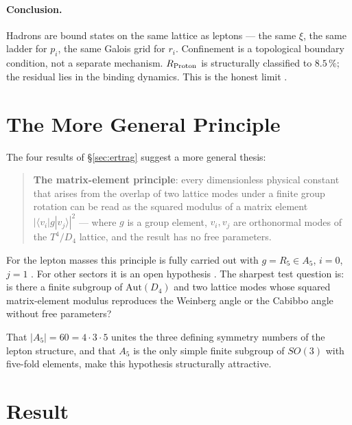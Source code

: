 \paragraph{Conclusion.}
Hadrons are bound states on the same lattice as leptons --- the same $\xi$,
the same ladder for $p_i$, the same Galois grid for $r_i$. Confinement is a
topological boundary condition, not a separate mechanism. $R_{\rm Proton}$
is structurally classified to $8.5\,\%$; the residual lies in the binding
dynamics. This is the honest limit \SM.

\section{The More General Principle}
\label{sec:prinzip}

The four results of §\ref{sec:ertrag} suggest a more general thesis:

\begin{quote}
\textbf{The matrix-element principle}: every dimensionless physical constant
that arises from the overlap of two lattice modes under a finite group
rotation can be read as the squared modulus of a matrix element
$|\langle v_i|g|v_j\rangle|^2$ --- where $g$ is a group element, $v_i, v_j$
are orthonormal modes of the $T^4/D_4$ lattice, and the result has no free
parameters.
\end{quote}

For the lepton masses this principle is fully carried out with
$g = R_5 \in A_5$, $i=0$, $j=1$ \BM. For other sectors it is an open
hypothesis \SM. The sharpest test question is: is there a finite subgroup of
$\mathrm{Aut}(D_4)$ and two lattice modes whose squared matrix-element
modulus reproduces the Weinberg angle or the Cabibbo angle without free
parameters?

That $|A_5|= 60 = 4 \cdot 3 \cdot 5$ unites the three defining symmetry
numbers of the lepton structure, and that $A_5$ is the only simple finite
subgroup of $SO(3)$ with five-fold elements, make this hypothesis
structurally attractive.

\section{Result}

